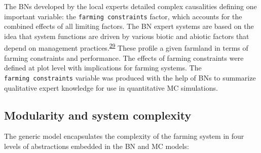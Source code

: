 \documentclass[]{elsarticle} %
\begin{document}
The BNs developed by the local experts detailed complex causalities defining one important variable: the \texttt{farming\ constraints} factor, which accounts for the combined effects of all limiting factors. The BN expert systems are based on the idea that system functions are driven by various biotic and abiotic factors that depend on management practices.\textsuperscript{\protect\hyperlink{ref-Jax_and_Setala_2005}{29}} These profile a given farmland in terms of farming constraints and performance. The effects of farming constraints were defined at plot level with implications for farming systems. The \texttt{farming\ constraints} variable was produced with the help of BNs to summarize qualitative expert knowledge for use in quantitative MC simulations.

\hypertarget{ref34}{%
\subsection{Modularity and system complexity}\label{ref34}}

The generic model encapsulates the complexity of the farming system in four levels of abstractions embedded in the BN and MC models:
\end{document}
